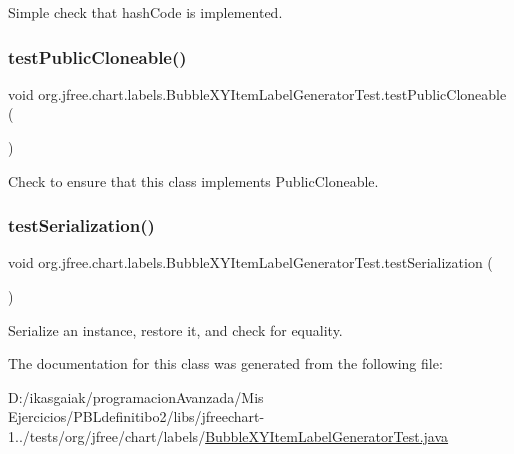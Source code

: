 Simple check that hash\+Code is implemented. \mbox{\label{classorg_1_1jfree_1_1chart_1_1labels_1_1_bubble_x_y_item_label_generator_test_a12cd5745fcae7ef2f434521663d520cb}} 
\subsubsection{\texorpdfstring{test\+Public\+Cloneable()}{testPublicCloneable()}}
{\footnotesize\ttfamily void org.\+jfree.\+chart.\+labels.\+Bubble\+X\+Y\+Item\+Label\+Generator\+Test.\+test\+Public\+Cloneable (\begin{DoxyParamCaption}{ }\end{DoxyParamCaption})}

Check to ensure that this class implements Public\+Cloneable. \mbox{\label{classorg_1_1jfree_1_1chart_1_1labels_1_1_bubble_x_y_item_label_generator_test_a0b09a43668f701fd112a75bafabbe0c3}} 
\subsubsection{\texorpdfstring{test\+Serialization()}{testSerialization()}}
{\footnotesize\ttfamily void org.\+jfree.\+chart.\+labels.\+Bubble\+X\+Y\+Item\+Label\+Generator\+Test.\+test\+Serialization (\begin{DoxyParamCaption}{ }\end{DoxyParamCaption})}

Serialize an instance, restore it, and check for equality. 

The documentation for this class was generated from the following file\+:\begin{DoxyCompactItemize}
\item 
D\+:/ikasgaiak/programacion\+Avanzada/\+Mis Ejercicios/\+P\+B\+Ldefinitibo2/libs/jfreechart-\/1../tests/org/jfree/chart/labels/\mbox{\hyperlink{_bubble_x_y_item_label_generator_test_8java}{Bubble\+X\+Y\+Item\+Label\+Generator\+Test.\+java}}\end{DoxyCompactItemize}
